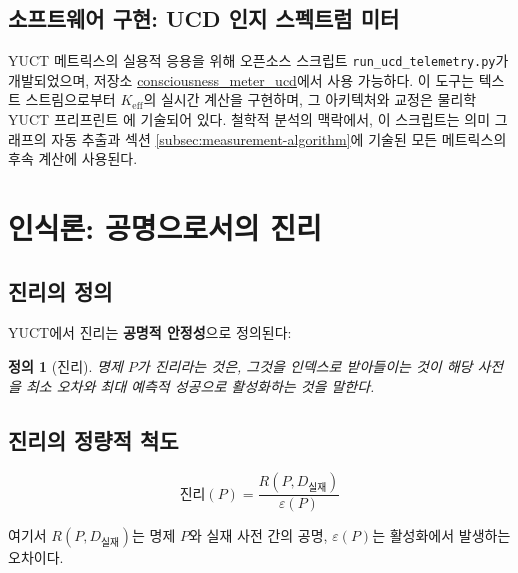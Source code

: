 \documentclass[11pt,a4paper]{article}
\newtheorem{definition}{정의}[section]
\newcommand{\eps}{\varepsilon}
\begin{document}
	\subsection{소프트웨어 구현: UCD 인지 스펙트럼 미터}
	\label{subsec:ucd-software}
	
	YUCT 메트릭스의 실용적 응용을 위해 오픈소스 스크립트 \texttt{run\_ucd\_telemetry.py}가 개발되었으며, 저장소 \href{https://github.com/Alexey-Yakushev-YUCT/consciousness_meter_ucd}{consciousness\_meter\_ucd}에서 사용 가능하다. 이 도구는 텍스트 스트림으로부터 \(K_{\mathrm{eff}}\)의 실시간 계산을 구현하며, 그 아키텍처와 교정은 물리학 YUCT 프리프린트 \cite{Yakushev2026b}에 기술되어 있다. 철학적 분석의 맥락에서, 이 스크립트는 의미 그래프의 자동 추출과 섹션 \ref{subsec:measurement-algorithm}에 기술된 모든 메트릭스의 후속 계산에 사용된다.
	
	
	\section{인식론: 공명으로서의 진리}
	
	\subsection{진리의 정의}
	
	YUCT에서 진리는 \textbf{공명적 안정성}으로 정의된다:
	
	\begin{definition}[진리]
		명제 \(P\)가 진리라는 것은, 그것을 인덱스로 받아들이는 것이 해당 사전을 최소 오차와 최대 예측적 성공으로 활성화하는 것을 말한다.
	\end{definition}
	
	\subsection{진리의 정량적 척도}
	
	\begin{equation}
		\text{진리}(P) = \frac{R(P, D_{\text{실재}})}{\eps(P)}
	\end{equation}
	
	여기서 \(R(P, D_{\text{실재}})\)는 명제 \(P\)와 실재 사전 간의 공명, \(\eps(P)\)는 활성화에서 발생하는 오차이다.
	
\end{document}
